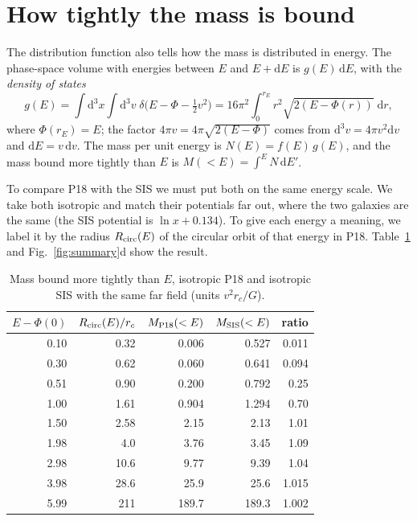 \documentclass[11pt,a4paper]{article}
\newcommand{\rc}{r_c}
\newcommand{\dd}{\mathrm{d}}
\begin{document}
\section{How tightly the mass is bound}\label{sec:energy}

The distribution function also tells how the mass is distributed in energy. The
phase-space volume with energies between $E$ and $E+\dd E$ is $g(E)\,\dd E$, with the
\emph{density of states}
\begin{equation}
  g(E)=\int\dd^3x\int\dd^3v\;\delta\bigl(E-\Phi-\tfrac12v^2\bigr)
  =16\pi^2\int_0^{r_E}r^2\sqrt{2(E-\Phi(r))}\;\dd r,
\end{equation}
where $\Phi(r_E)=E$; the factor $4\pi v=4\pi\sqrt{2(E-\Phi)}$ comes from
$\dd^3v=4\pi v^2\dd v$ and $\dd E=v\,\dd v$. The mass per unit energy is
$N(E)=f(E)\,g(E)$, and the mass bound more tightly than $E$ is
$M(<E)=\int^E N\,\dd E'$.

To compare P18 with the SIS we must put both on the same energy scale. We take both
isotropic and match their potentials far out, where the two galaxies are the same
(the SIS potential is $\ln x+0.134$). To give each energy a meaning, we label it by
the radius $R_{\rm circ}(E)$ of the circular orbit of that energy in P18.
Table~\ref{tab:energy} and Fig.~\ref{fig:summary}d show the result.

\begin{table}[h]
\centering\small
\caption{Mass bound more tightly than $E$, isotropic P18 and isotropic SIS with the
same far field (units $v^2\rc/G$).}
\label{tab:energy}
\begin{tabular}{rrrrr}
\toprule
$E-\Phi(0)$ & $R_{\rm circ}(E)/\rc$ & $M_{\rm P18}(<E)$ & $M_{\rm SIS}(<E)$ & ratio\\
\midrule
0.10 & 0.32 & 0.006 & 0.527 & 0.011\\
0.30 & 0.62 & 0.060 & 0.641 & 0.094\\
0.51 & 0.90 & 0.200 & 0.792 & 0.25\\
1.00 & 1.61 & 0.904 & 1.294 & 0.70\\
1.50 & 2.58 & 2.15 & 2.13 & 1.01\\
1.98 & 4.0 & 3.76 & 3.45 & 1.09\\
2.98 & 10.6 & 9.77 & 9.39 & 1.04\\
3.98 & 28.6 & 25.9 & 25.6 & 1.015\\
5.99 & 211 & 189.7 & 189.3 & 1.002\\
\bottomrule
\end{tabular}
\end{table}
\end{document}

